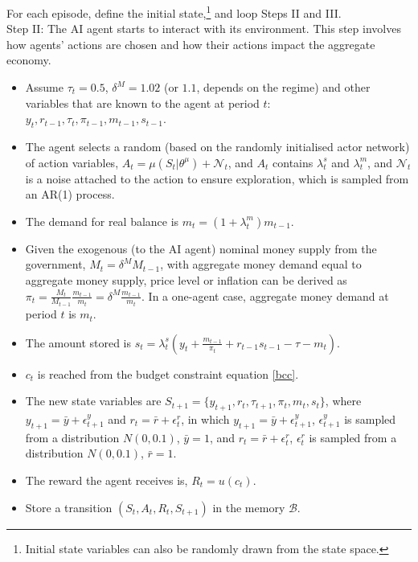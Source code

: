 \documentclass[hidelinks]{article}
\begin{document}
For each episode, define the initial state,\footnote{Initial state variables can also be randomly drawn from the state space.} and loop Steps II and III.\\

Step II: The AI agent starts to interact with its environment. This step involves how agents' actions are chosen and how their actions impact the aggregate economy. 

\begin{itemize}
	\item Assume $\tau_t = 0.5$, $\delta^M = 1.02$ (or $1.1$, depends on the regime) and other variables that are known to the agent at period $t$: $y_t, r_{t-1}, \tau_t, \pi_{t-1}, m_{t-1}, s_{t-1}$.
	\item The agent selects a random (based on the randomly initialised actor network) of action variables, $A_t = \mu(S_t|\theta^\mu) + \mathcal{N}_t$, and $A_t$ contains $\lambda^s_t$ and $\lambda^m_t$, and $\mathcal{N}_t$ is a noise attached to the action to ensure exploration, which is sampled from an AR(1) process.
	
	\item The demand for real balance is $m_{t} = (1+\lambda^m_t) m_{t-1}$.
	\item Given the exogenous (to the AI agent) nominal money supply from the government, $M_{t} = \delta^M M_{t-1}$, with aggregate money demand equal to aggregate money supply, price level or inflation can be derived as $\pi_t =\frac{M_{t}}{M_{t-1}}\frac{m_{t-1}}{m_{t}}= \delta^M \frac{m_{t-1}}{m_{t}}$. In a one-agent case, aggregate money demand at period $t$ is $m_{t}$.
	
	\item The amount stored is $s_{t} = \lambda^s_{t} (y_t + \frac{m_{t-1} }{\pi_t} + r_{t-1} s_{t-1 } - \tau - m_{t})$.
	\item $c_t$ is reached from the budget constraint equation \ref{bcc}.
	\item The new state variables are $S_{t+1} = \{y_{t+1}, r_{t}, \tau_{t+1}, \pi_{t}, m_{t}, s_{t}\}$, where $y_{t+1} = \bar{y} + \epsilon^y_{t+1}$ and $r_{t} = \bar{r} + \epsilon^r_{t}$, in which $y_{t+1} = \bar{y} + \epsilon^y_{t+1}$, $\epsilon^y_{t+1}$ is sampled from a distribution $N(0,0.1)$, $\bar{y} = 1$, and $r_{t} = \bar{r} + \epsilon^r_{t}$, $\epsilon^r_{t}$ is sampled from a distribution $N(0,0.1)$, $\bar{r} = 1$.
	\item The reward the agent receives is, $R_t = u(c_t)$.
	\item Store a transition $(S_t, A_t, R_t, S_{t+1})$ in the memory $\mathcal{B}$.

\end{itemize}
\end{document}
